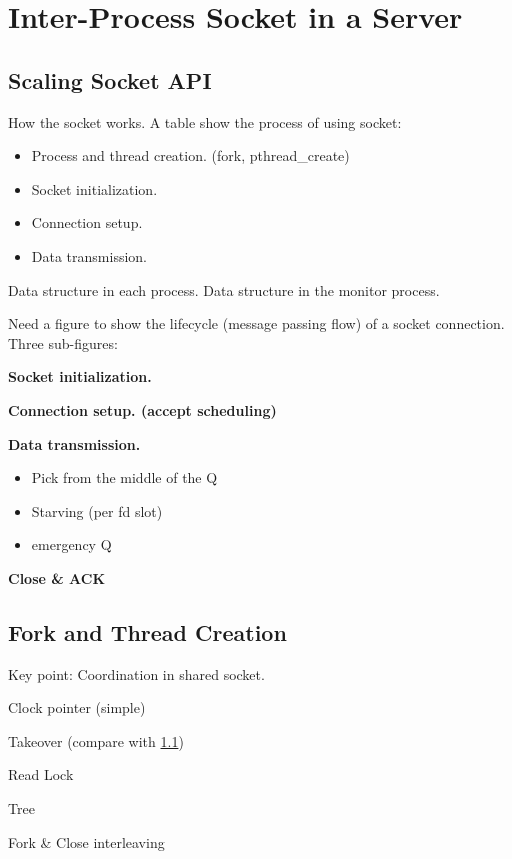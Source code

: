 \section{Inter-Process Socket in a Server}
\label{sec:intra-server}

\subsection{Scaling Socket API}
\label{subsec:socket-api}

How the socket works. A table show the process of using socket:

\begin{itemize}
	\item Process and thread creation. (fork, pthread\_create)
	\item Socket initialization.
	\item Connection setup.
	\item Data transmission.
\end{itemize}


Data structure in each process. Data structure in the monitor process.

Need a figure to show the lifecycle (message passing flow) of a socket connection. Three sub-figures:


	 \textbf{Socket initialization.}
	  
	 \textbf{Connection setup. (accept scheduling)}
	 
	 \textbf{Data transmission.}
\begin{itemize}
	\item Pick from the middle of the Q
	\item Starving (per fd slot)
	\item emergency Q
\end{itemize}

    \textbf{Close \& ACK}


\subsection{Fork and Thread Creation}
\label{subsec:fork}

Key point: Coordination in shared socket.

Clock pointer (simple)

Takeover (compare with \ref{subsec:socket-api})

Read Lock

Tree

Fork \& Close interleaving


